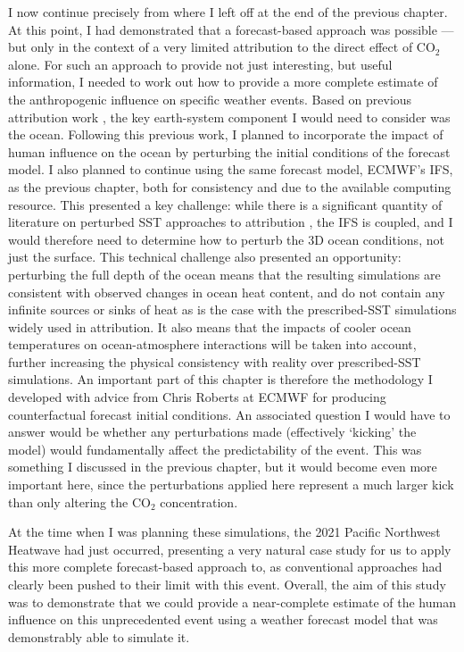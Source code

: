   I now continue precisely from where I left off at the end of the previous chapter. At this point, I had demonstrated that a forecast-based approach was possible --- but only in the context of a very limited attribution to the direct effect of CO$_2$ alone. For such an approach to provide not just interesting, but useful information, I needed to work out how to provide a more complete estimate of the anthropogenic influence on specific weather events. Based on previous attribution work \citep{pall_anthropogenic_2011}, the key earth-system component I would need to consider was the ocean. Following this previous work, I planned to incorporate the impact of human influence on the ocean by perturbing the initial conditions of the forecast model. I also planned to continue using the same forecast model, ECMWF's IFS, as the previous chapter, both for consistency and due to the available computing resource. This presented a key challenge: while there is a significant quantity of literature on perturbed SST approaches to attribution \citep{stone_benchmark_2021}, the IFS is coupled, and I would therefore need to determine how to perturb the 3D ocean conditions, not just the surface. This technical challenge also presented an opportunity: perturbing the full depth of the ocean means that the resulting simulations are consistent with observed changes in ocean heat content, and do not contain any infinite sources or sinks of heat as is the case with the prescribed-SST simulations widely used in attribution. It also means that the impacts of cooler ocean temperatures on ocean-atmosphere interactions will be taken into account, further increasing the physical consistency with reality over prescribed-SST simulations. An important part of this chapter is therefore the methodology I developed with advice from Chris Roberts at ECMWF for producing counterfactual forecast initial conditions. An associated question I would have to answer would be whether any perturbations made (effectively `kicking' the model) would fundamentally affect the predictability of the event. This was something I discussed in the previous chapter, but it would become even more important here, since the perturbations applied here represent a much larger kick than only altering the CO$_2$ concentration.

  At the time when I was planning these simulations, the 2021 Pacific Northwest Heatwave had just occurred, presenting a very natural case study for us to apply this more complete forecast-based approach to, as conventional approaches had clearly been pushed to their limit with this event. Overall, the aim of this study was to demonstrate that we could provide a near-complete estimate of the human influence on this unprecedented event using a weather forecast model that was demonstrably able to simulate it.

